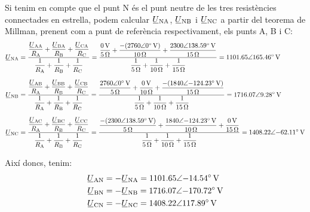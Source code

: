 \begin{exemple}
    Si tenim en compte que el punt N és el punt neutre de les tres resistències connectades en estrella, podem calcular $\cmplx{U}\ped{NA} $, $\cmplx{U}\ped{NB} $ i $\cmplx{U}\ped{NC}$ a partir del teorema de Millman, prenent com a punt de referència respectivament, els punts A,  B  i C:
    \begin{align*}
          \cmplx{U}\ped{NA} &= \frac{\dfrac{\cmplx{U}\ped{AA}}{R\ped{A}} + \dfrac{\cmplx{U}\ped{BA}}{R\ped{B}} + \dfrac{\cmplx{U}\ped{CA}}{R\ped{C}}}{\dfrac{1}{R\ped{A}} + \dfrac{1}{R\ped{B}} + \dfrac{1}{R\ped{C}}} = \frac{\dfrac{\qty{0}{V}}{\qty{5}{\ohm}} + \dfrac{-(\complexqty{2760:0}{V})}{\qty{10}{\ohm}} + \dfrac{\complexqty{2300:138,59}{V}}{\qty{15}{\ohm}}}{\dfrac{1}{\qty{5}{\ohm}} + \dfrac{1}{\qty{10}{\ohm}} + \dfrac{1}{\qty{15}{\ohm}}} = \complexqty{1101,65:165,46}{V} \\[1.5ex]
          \cmplx{U}\ped{NB} &= \frac{\dfrac{\cmplx{U}\ped{AB}}{R\ped{A}} + \dfrac{\cmplx{U}\ped{BB}}{R\ped{B}} + \dfrac{\cmplx{U}\ped{CB}}{R\ped{C}}}{\dfrac{1}{R\ped{A}} + \dfrac{1}{R\ped{B}} + \dfrac{1}{R\ped{C}}} = \frac{\dfrac{\complexqty{2760:0}{V}}{\qty{5}{\ohm}} + \dfrac{\qty{0}{V}}{\qty{10}{\ohm}} + \dfrac{-(\complexqty{1840:-124,23}{V})}{\qty{15}{\ohm}}}{\dfrac{1}{\qty{5}{\ohm}} + \dfrac{1}{\qty{10}{\ohm}} + \dfrac{1}{\qty{15}{\ohm}}} = \complexqty{1716,07:9,28}{V} \\[1.5ex]
          \cmplx{U}\ped{NC} &= \frac{\dfrac{\cmplx{U}\ped{AC}}{R\ped{A}} + \dfrac{\cmplx{U}\ped{BC}}{R\ped{B}} + \dfrac{\cmplx{U}\ped{CC}}{R\ped{C}}}{\dfrac{1}{R\ped{A}} + \dfrac{1}{R\ped{B}} + \dfrac{1}{R\ped{C}}} = \frac{\dfrac{-(\complexqty{2300:138,59}{V})}{\qty{5}{\ohm}} + \dfrac{\complexqty{1840:-124,23}{V}}{\qty{10}{\ohm}} + \dfrac{\qty{0}{V}}{\qty{15}{\ohm}}}{\dfrac{1}{\qty{5}{\ohm}} + \dfrac{1}{\qty{10}{\ohm}} + \dfrac{1}{\qty{15}{\ohm}}} = \complexqty{1408,22:-62.11}{V}
    \end{align*}

    Així doncs, tenim:
    \begin{align*}
        \cmplx{U}\ped{AN} &= -\cmplx{U}\ped{NA} =  \complexqty{1101,65:-14,54}{V} \\
        \cmplx{U}\ped{BN} &= -\cmplx{U}\ped{NB} =  \complexqty{1716,07:-170,72}{V} \\
        \cmplx{U}\ped{CN} &= -\cmplx{U}\ped{NC} =  \complexqty{1408,22:117,89}{V}
    \end{align*}


\end{exemple}
